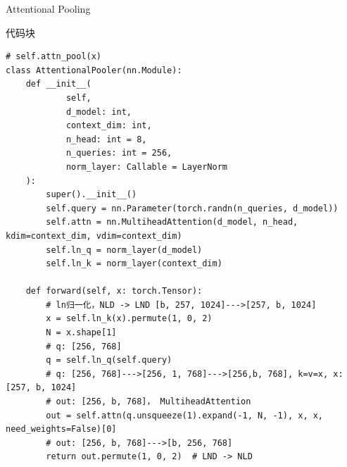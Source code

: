 \documentclass[zihao=false,fontset=windows]{ctexart}
\newcommand{\codehead}{{\small\ttfamily\color{feishuGray}代码块}\par\vspace{-0.15em}}
\begin{document}
Attentional Pooling\par
\begin{feishucode}
\codehead
\begin{lstlisting}
# self.attn_pool(x)
class AttentionalPooler(nn.Module):
    def __init__(
            self,
            d_model: int,
            context_dim: int,
            n_head: int = 8,
            n_queries: int = 256,
            norm_layer: Callable = LayerNorm
    ):
        super().__init__()
        self.query = nn.Parameter(torch.randn(n_queries, d_model))
        self.attn = nn.MultiheadAttention(d_model, n_head, kdim=context_dim, vdim=context_dim)
        self.ln_q = norm_layer(d_model)
        self.ln_k = norm_layer(context_dim)

    def forward(self, x: torch.Tensor):
        # ln归一化，NLD -> LND [b, 257, 1024]--->[257, b, 1024]
        x = self.ln_k(x).permute(1, 0, 2)
        N = x.shape[1]
        # q: [256, 768]
        q = self.ln_q(self.query)
        # q: [256, 768]--->[256, 1, 768]--->[256,b, 768], k=v=x, x:[257, b, 1024]
        # out: [256, b, 768]， MultiheadAttention
        out = self.attn(q.unsqueeze(1).expand(-1, N, -1), x, x, need_weights=False)[0]
        # out: [256, b, 768]--->[b, 256, 768]
        return out.permute(1, 0, 2)  # LND -> NLD
\end{lstlisting}
\end{feishucode}
\end{document}
